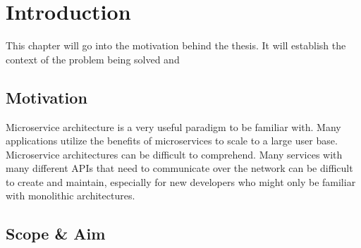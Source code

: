 \chapter{Introduction}
This chapter will go into the motivation behind the thesis. It will establish the context of the problem being solved and 


\section{Motivation}
Microservice architecture is a very useful paradigm to be familiar with. Many applications utilize the benefits of microservices to scale to a large user base. 
Microservice architectures can be difficult to comprehend. Many services with many different APIs that need to communicate over the network can be difficult to create and maintain, especially for new developers who might only be familiar with
monolithic architectures. 

\section{Scope \& Aim}